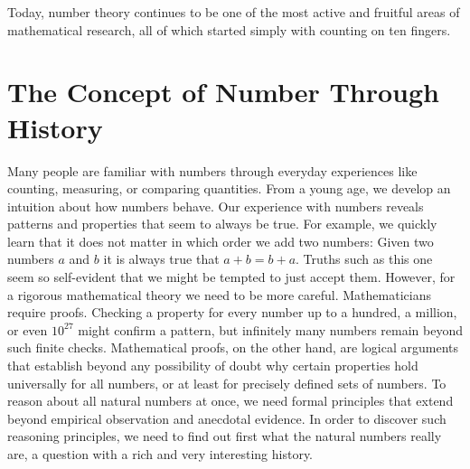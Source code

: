 Today, number theory continues to be one of the most active and fruitful areas of mathematical research, all of which started simply with counting on ten fingers.

\section{The Concept of Number Through History}

Many people are familiar with numbers through everyday experiences like counting, measuring, or comparing quantities. From a young age, we develop an intuition about how numbers behave. Our experience with numbers reveals patterns and properties that seem to always be true. For example, we quickly learn that it does not matter in which order we add two numbers: Given two numbers $a$ and $b$ it is always true that $a+b=b+a$. Truths such as this one seem so self-evident that we might be tempted to just accept them. However, for a rigorous mathematical theory we need to be more careful. Mathematicians require proofs. Checking a property for every number up to a hundred, a million, or even $10^{27}$ might confirm a pattern, but infinitely many numbers remain beyond such finite checks. Mathematical proofs, on the other hand, are logical arguments that establish beyond any possibility of doubt why certain properties hold universally for all numbers, or at least for precisely defined sets of numbers. To reason about all natural numbers at once, we need formal principles that extend beyond empirical observation and anecdotal evidence. In order to discover such reasoning principles, we need to find out first what the natural numbers really are, a question with a rich and very interesting history.


